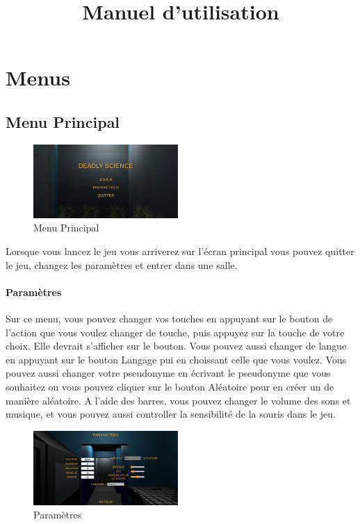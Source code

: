 \documentclass{article}
\title{Manuel d'utilisation}
\begin{document}
\maketitle
\tableofcontents

\newpage
\section{Menus}
\subsection{Menu Principal}

\begin{figure}[H]
	\centering
	\includegraphics[width=0.49\textwidth]{MainMenu.png}
	\caption{Menu Principal}
	\label{Menu Principal}
\end{figure}

Lorsque vous lancez le jeu vous arriverez sur l'écran principal vous pouvez quitter le jeu, changez les paramètres et entrer dans une salle.
\paragraph{Paramètres}

Sur ce menu, vous pouvez changer vos touches en appuyant sur le bouton de l'action que vous voulez changer de touche, puis appuyez sur la touche de votre choix. Elle devrait s'afficher sur le bouton. Vous pouvez aussi changer de langue en appuyant sur le bouton Langage pui en choissant celle que vous voulez. Vous pouvez aussi changer votre pseudonyme en écrivant le pseudonyme que vous souhaitez ou vous pouvez cliquer sur le bouton Aléatoire pour en créer un de manière aléatoire. A l'aide des barres, vous pouvez changer le volume des sons et musique, et vous pouvez aussi controller la sensibilité de la souris dans le jeu.

\begin{figure}[H]
	\centering
	\includegraphics[width=0.49\textwidth]{parametres.png}
	\caption{Paramètres}
	\label{Paramètres}
\end{figure}
\end{document}
